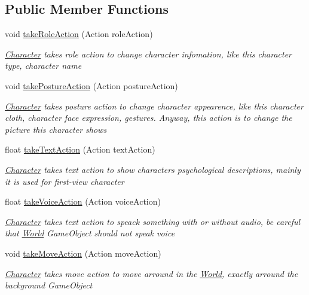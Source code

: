 \subsection*{Public Member Functions}
\begin{DoxyCompactItemize}
\item 
void \hyperlink{class_character_a573341815bfa78669477195374daadf1}{take\+Role\+Action} (Action role\+Action)
\begin{DoxyCompactList}\small\item\em \hyperlink{class_character}{Character} takes role action to change character infomation, like this character type, character name \end{DoxyCompactList}\item 
void \hyperlink{class_character_a69ac951b0d4ae081906647d9f1aed69b}{take\+Posture\+Action} (Action posture\+Action)
\begin{DoxyCompactList}\small\item\em \hyperlink{class_character}{Character} takes posture action to change character appearence, like this character cloth, character face expression, gestures. Anyway, this action is to change the picture this character shows \end{DoxyCompactList}\item 
float \hyperlink{class_character_aecab3ff77e1465b64ab5fbf17b5b5401}{take\+Text\+Action} (Action text\+Action)
\begin{DoxyCompactList}\small\item\em \hyperlink{class_character}{Character} takes text action to show character\textquotesingle{}s psychological descriptions, mainly it is used for first-\/view character \end{DoxyCompactList}\item 
float \hyperlink{class_character_a5889e5d24f7f965fed30c9ed4e16d747}{take\+Voice\+Action} (Action voice\+Action)
\begin{DoxyCompactList}\small\item\em \hyperlink{class_character}{Character} takes text action to speack something with or without audio, be careful that \hyperlink{class_world}{World} Game\+Object should not speak voice \end{DoxyCompactList}\item 
void \hyperlink{class_character_a29dfe4685fcb35c7d7bd76cca05f54b7}{take\+Move\+Action} (Action move\+Action)
\begin{DoxyCompactList}\small\item\em \hyperlink{class_character}{Character} takes move action to move arround in the \hyperlink{class_world}{World}, exactly arround the background Game\+Object \end{DoxyCompactList}\item 

\end{DoxyCompactItemize}
